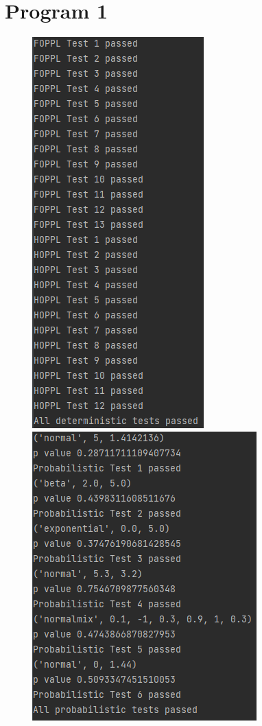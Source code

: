 \documentclass[10pt]{homeworg}
\begin{document}
\section*{Program 1}
\begin{figure}[!htbp]
    \centering
    \begin{minipage}{0.45\textwidth}
        \centering
       \includegraphics[scale=0.5]{../figures/deterministic.png}
    \end{minipage}\hfill
    \begin{minipage}{0.45\textwidth}
        \centering
        \includegraphics[scale=0.8]{../figures/probabilistic.png}
    \end{minipage}
\end{figure}
\end{document}
